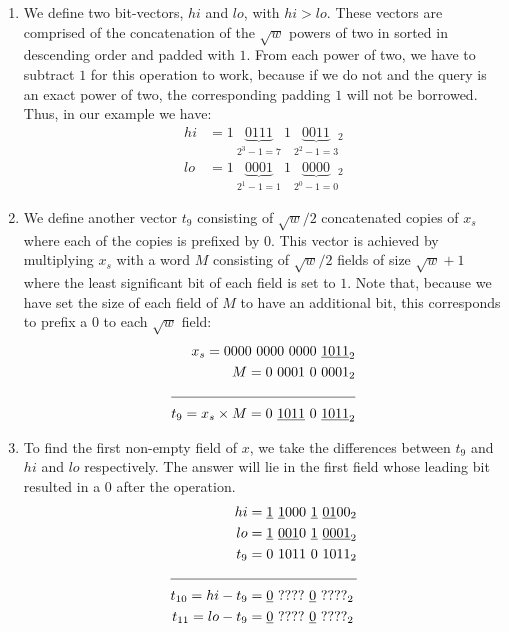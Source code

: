\begin{enumerate}
    \item \label{blt:parallel1}
    We define two bit-vectors, $hi$ and $lo$, with $hi > lo$. These vectors are comprised of the concatenation of the $\sqrt{w}$ powers of two in sorted in descending order and padded with $1$. From each power of two, we have to subtract $1$ for this operation to work, because if we do not and the query is an exact power of two, the corresponding padding $1$ will not be borrowed. Thus, in our example we have:
    \begin{align*}
        hi &= 1\ \underbrace{0111}_{2^3-1=7}\ 1\ \underbrace{0011}_{2^2-1=3}{}_2\\
        lo &= 1\ \underbrace{0001}_{2^1-1=1}\ 1\ \underbrace{0000}_{2^0-1=0}{}_2
    \end{align*}
    
    \item \label{blt:parallel2}
    We define another vector $t_9$ consisting of $\sqrt{w}/2$ concatenated copies of $x_s$ where each of the copies is prefixed by $0$. This vector is achieved by multiplying $x_s$ with a word $M$ consisting of $\sqrt{w}/2$ fields of size $\sqrt{w} + 1$ where the least significant bit of each field is set to $1$. Note that, because we have set the size of each field of $M$ to have an additional bit, this corresponds to prefix a $0$ to each $\sqrt{w}$ field:
    \begin{align*}
        x_s = 0000\ 0000\ 0000\ &\underline{1011}_2\\ 
        M = 0\ 0001\ 0\ &0001_2\\ \cline{1-2}
        t_9 = x_s \times M = 0\ \underline{1011}\ 0\ &\underline{1011}_2
    \end{align*}
    
    \item \label{blt:parallel3}
    To find the first non-empty field of $x$, we take the differences between $t_9$ and $hi$ and $lo$ respectively. The answer will lie in the first field whose leading bit resulted in a $0$ after the operation.
    \begin{align*}
                          hi &= \underline{1}\ \underline{1}000\ \underline{1}\ \underline{01}00_2\\
                          lo &= \underline{1}\ \underline{001}0\ \underline{1}\ \underline{0001}_2 \\
                      t_9 &= 0\ 1011\ 0\ 1011_2\\ \cline{1-2}
        t_{10} = hi - t_9 &= \underline{0}\ ????\ \underline{0}\ ????_2 \\
        t_{11} = lo - t_9 &= \underline{0}\ ????\ \underline{0}\ ????_2
    \end{align*}
    

\end{enumerate}

